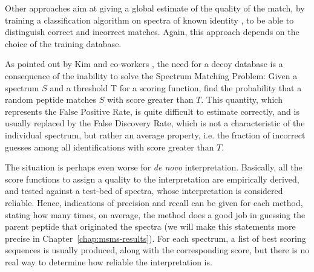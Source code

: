 Other approaches aim at giving a global estimate of the quality of the match, by
training a classification algorithm on spectra of known identity 
\cite{proteinprophet2002}, to be able to distinguish correct
and incorrect matches. Again, this approach depends on the choice of the
training database.

As pointed out by Kim and co-workers
\cite{Kim2008}, the need for a decoy database is a
consequence of the inability to solve the Spectrum Matching Problem: Given a
spectrum $S$ and a threshold T for a scoring function, find the probability that a
random peptide matches $S$ with score greater than $T$. This quantity, which
represents the False Positive Rate, is quite difficult to estimate correctly,
and is usually replaced by the False Discovery Rate, which is not a
characteristic of the individual spectrum, but rather an average property, i.e.
the fraction of incorrect guesses among all identifications with score greater
than $T$.



The situation is perhaps even worse for \emph{de novo} interpretation.
Basically, all the score functions to assign a quality to the interpretation are
empirically derived, and tested against a test-bed of spectra, whose
interpretation is considered reliable. Hence, indications of precision and
recall can be given for each method, stating how many times, on average, the
method does a good job in guessing the parent peptide that originated the
spectra (we will make this statements more precise in
Chapter~\ref{chap:msms-results}). 
For each spectrum, a list of best scoring sequences is usually
produced, along with the corresponding score, but there is no real way to
determine how reliable the interpretation is.

